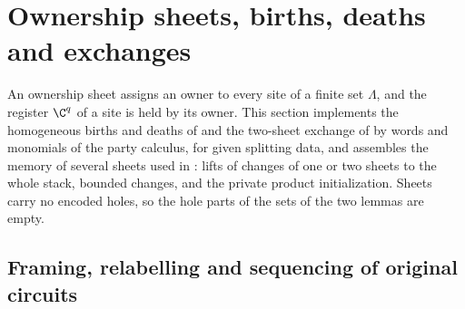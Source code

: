 \section{Ownership sheets, births, deaths and exchanges}
\label{sec:party_sheets}

An ownership sheet assigns an owner to every site of a finite set $\Lambda$, and the register
$\C^q$ of a site is held by its owner. This section implements the homogeneous births and
deaths of \cite[Lemma~6.5]{OpenAI2026PolynomialPEPS} and the two-sheet exchange of
\cite[Lemma~6.6]{OpenAI2026PolynomialPEPS} by words and monomials of the party calculus, for
given splitting data, and assembles the memory of several sheets used in
\cite[Proposition~7.1]{OpenAI2026PolynomialPEPS}: lifts of changes of one or two sheets to the
whole stack, bounded changes, and the private product initialization. Sheets carry no encoded
holes, so the hole parts of the sets of the two lemmas are empty.

\subsection{Framing, relabelling and sequencing of original circuits}

